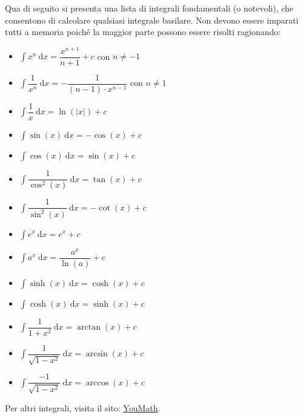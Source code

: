 \documentclass[a4paper]{article}
\begin{document}
	Qua di seguito si presenta una lista di integrali fondamentali (o notevoli), che consentono di calcolare qualsiasi integrale basilare. Non devono essere imparati tutti a memoria poiché la maggior parte possono essere risolti ragionando:
	\begin{itemize}
		\item $\displaystyle\int x^{n} \: \mathrm{d}x = \dfrac{x^{n+1}}{n+1}+c$ \hspace{1em} con $n \ne -1$

		\item $\displaystyle\int \dfrac{1}{x^{n}} \: \mathrm{d}x = - \dfrac{1}{\left(n-1\right) \cdot x^{n-1}}$ \hspace{1em} con $n \ne 1$

		\item $\displaystyle\int \dfrac{1}{x} \: \mathrm{d}x = \ln\left(|x|\right) + c$

		\item $\displaystyle\int \sin\left(x\right) \: \mathrm{d}x = -\cos\left(x\right) + c$

		\item $\displaystyle\int \cos\left(x\right) \: \mathrm{d}x = \sin\left(x\right) + c$

		\item $\displaystyle\int \dfrac{1}{\cos^{2}\left(x\right)} \: \mathrm{d}x = \tan\left(x\right) + c$

		\item $\displaystyle\int \dfrac{1}{\sin^{2}\left(x\right)} \: \mathrm{d}x = -\cot\left(x\right) + c$

		\item $\displaystyle\int e^{x} \: \mathrm{d}x = e^{x} + c$

		\item $\displaystyle\int a^{x} \: \mathrm{d}x = \dfrac{a^{x}}{\ln\left(a\right)} + c$

		\item $\displaystyle\int \sinh\left(x\right) \: \mathrm{d}x = \cosh\left(x\right) + c$

		\item $\displaystyle\int \cosh\left(x\right) \: \mathrm{d}x = \sinh\left(x\right) + c$

		\item $\displaystyle\int \dfrac{1}{1+x^{2}} \: \mathrm{d}x = \arctan\left(x\right) + c$

		\item $\displaystyle\int \dfrac{1}{\sqrt{1-x^{2}}} \: \mathrm{d}x = \arcsin\left(x\right) + c$

		\item $\displaystyle\int \dfrac{-1}{\sqrt{1-x^{2}}} \: \mathrm{d}x = \arccos\left(x\right) + c$
	\end{itemize}
	Per altri integrali, visita il sito: \href{https://www.youmath.it/lezioni/analisi-matematica/integrali/596-integrali-notevoli.html}{YouMath}.\newpage
\end{document}
